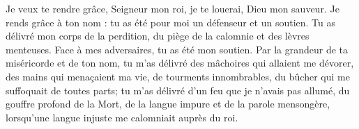 Je veux te rendre grâce, Seigneur mon roi,
	je te louerai, Dieu mon sauveur.
Je rends grâce à ton nom :
	tu as été pour moi un défenseur et un soutien.
Tu as délivré mon corps de la perdition,
	du piège de la calomnie et des lèvres menteuses.
Face à mes adversaires, tu as été mon soutien.
Par la grandeur de ta miséricorde et de ton nom,
	tu m’as délivré des mâchoires qui allaient me dévorer,
	des mains qui menaçaient ma vie, de tourments innombrables,
	du bûcher qui me suffoquait de toutes parts;
	tu m’as délivré d’un feu que je n’avais pas allumé,
	du gouffre profond de la Mort,
		de la langue impure et de la parole mensongère,
	lorsqu’une langue injuste me calomniait auprès du roi.
